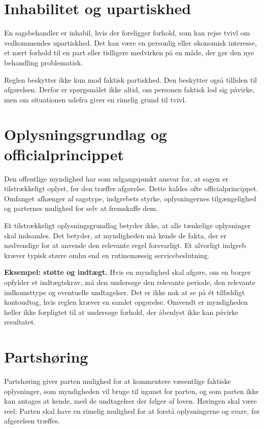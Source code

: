 \section{Inhabilitet og upartiskhed}

En sagsbehandler er inhabil, hvis der foreligger forhold, som kan rejse tvivl om vedkommendes upartiskhed. Det kan være en personlig eller økonomisk interesse, et nært forhold til en part eller tidligere medvirken på en måde, der gør den nye behandling problematisk.

Reglen beskytter ikke kun mod faktisk partiskhed. Den beskytter også tilliden til afgørelsen. Derfor er spørgsmålet ikke altid, om personen faktisk lod sig påvirke, men om situationen udefra giver en rimelig grund til tvivl.

\section{Oplysningsgrundlag og officialprincippet}

Den offentlige myndighed har som udgangspunkt ansvar for, at sagen er tilstrækkeligt oplyst, før den træffer afgørelse. Dette kaldes ofte officialprincippet. Omfanget afhænger af sagstype, indgrebets styrke, oplysningernes tilgængelighed og parternes mulighed for selv at fremskaffe dem.

Et tilstrækkeligt oplysningsgrundlag betyder ikke, at alle tænkelige oplysninger skal indsamles. Det betyder, at myndigheden må kende de fakta, der er nødvendige for at anvende den relevante regel forsvarligt. Et alvorligt indgreb kræver typisk større omhu end en rutinemæssig servicebeslutning.

\begin{examplebox}
\textbf{Eksempel: støtte og indtægt.} Hvis en myndighed skal afgøre, om en borger opfylder et indtægtskrav, må den undersøge den relevante periode, den relevante indkomsttype og eventuelle undtagelser. Det er ikke nok at se på ét tilfældigt kontoudtog, hvis reglen kræver en samlet opgørelse. Omvendt er myndigheden heller ikke forpligtet til at undersøge forhold, der åbenlyst ikke kan påvirke resultatet.
\end{examplebox}

\section{Partshøring}

Partshøring giver parten mulighed for at kommentere væsentlige faktiske oplysninger, som myndigheden vil bruge til ugunst for parten, og som parten ikke kan antages at kende, med de undtagelser der følger af loven. Høringen skal være reel: Parten skal have en rimelig mulighed for at forstå oplysningerne og svare, før afgørelsen træffes.


